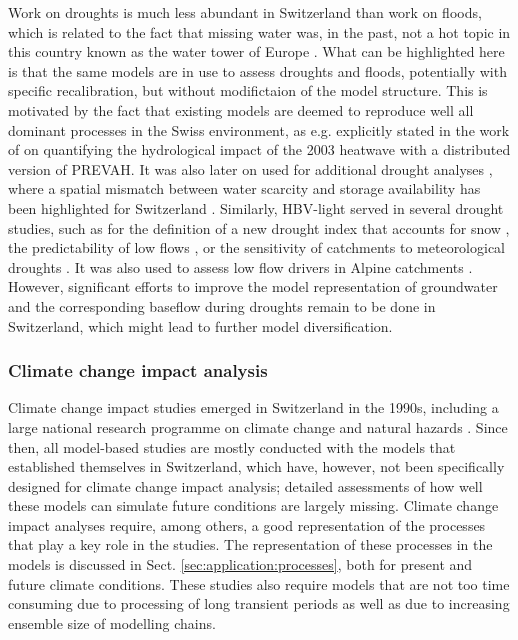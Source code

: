 \documentclass[10pt,a4paper]{article}
\begin{document}
Work on droughts is much less abundant in Switzerland than work on floods, which is related to the fact that missing water was, in the past, not a hot topic in this country known as the water tower of Europe \citep{Milano2015}. What can be highlighted here is that the same models are in use to assess droughts and floods, potentially with specific recalibration, but without modifictaion of the model structure. This is motivated by the fact that existing models are deemed to reproduce well all dominant processes in the Swiss environment, as e.g. explicitly stated in the work of \citet{Zappa2007a} on quantifying the hydrological impact of the 2003 heatwave with a distributed version of PREVAH. It was also later on used for additional drought analyses \citep{Brunner2019e, Zappa2019}, where a spatial mismatch between water scarcity and storage availability has been highlighted for Switzerland \citep{Brunner2019e}. Similarly, HBV-light served in several drought studies, such as for the definition of a new drought index that accounts for snow \citep{Staudinger2014}, the predictability of low flows \citep{Staudinger2014a}, or the sensitivity of catchments to meteorological droughts \citep{Staudinger2015}. It was also used to assess low flow drivers in Alpine catchments \citep{Arnoux2020}. However, significant efforts to improve the model representation of groundwater and the corresponding baseflow during droughts remain to be done in Switzerland, which might lead to further model diversification.


\subsubsection{Climate change impact analysis}
\label{sec:application:climatechange}

Climate change impact studies emerged in Switzerland in the 1990s, including a large national research programme on climate change and natural hazards \citep{SNFS2021}. Since then, all model-based studies are mostly conducted with the models that established themselves in Switzerland, which have, however, not been specifically designed for climate change impact analysis; detailed assessments of how well these models can simulate future conditions are largely missing. Climate change impact analyses require, among others, a good representation of the processes that play a key role in the studies. The representation of these processes in the models is discussed in Sect. \ref{sec:application:processes}, both for present and future climate conditions. These studies also require models that are not too time consuming due to processing of long transient periods as well as due to increasing ensemble size of modelling chains.
\end{document}
